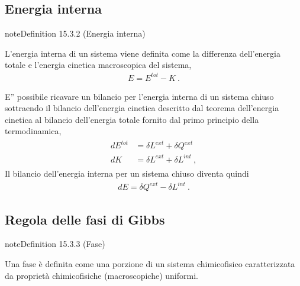 \documentclass[letterpaper,10pt,italian]{jupyterBook}
\begin{document}
\subsection{Energia interna}
\label{\detokenize{ch/thermodynamics/principles-gibbs-phase-rule:energia-interna}}\label{\detokenize{ch/thermodynamics/principles-gibbs-phase-rule:physics-hs-thermodynamics-foundation-principles-gibbs-phase-rule-internal-energy}}\label{ch/thermodynamics/principles-gibbs-phase-rule:definition-2}
\begin{sphinxadmonition}{note}{Definition 15.3.2 (Energia interna)}



\sphinxAtStartPar
L’energia interna di un sistema viene definita come la differenza dell’energia totale e l’energia cinetica macroscopica del sistema,
\begin{equation*}
\begin{split}E = E^{tot} - K \ .\end{split}
\end{equation*}\end{sphinxadmonition}

\sphinxAtStartPar
E” possibile ricavare un bilancio per l’energia interna di un sistema chiuso sottraendo il bilancio dell’energia cinetica descritto dal teorema dell’energia cinetica al bilancio dell’energia totale fornito dal primo principio della termodinamica,
\begin{equation*}
\begin{split}\begin{aligned}
  d E^{tot} & = \delta L^{ext} + \delta Q^{ext} \\
  d K       & = \delta L^{ext} + \delta L^{int} \ ,
\end{aligned}\end{split}
\end{equation*}
\sphinxAtStartPar
Il bilancio dell’energia interna per un sistema chiuso diventa quindi
\begin{equation*}
\begin{split}d E = \delta Q^{ext} - \delta L^{int} \ .\end{split}
\end{equation*}

\subsection{Regola delle fasi di Gibbs}
\label{\detokenize{ch/thermodynamics/principles-gibbs-phase-rule:regola-delle-fasi-di-gibbs}}\label{\detokenize{ch/thermodynamics/principles-gibbs-phase-rule:physics-hs-thermodynamics-foundation-principles-gibbs-phase-rule-gibbs-phase-rule}}\label{ch/thermodynamics/principles-gibbs-phase-rule:definition-3}
\begin{sphinxadmonition}{note}{Definition 15.3.3 (Fase)}



\sphinxAtStartPar
Una fase è definita come una porzione di un sistema chimico\sphinxhyphen{}fisico caratterizzata da proprietà chimico\sphinxhyphen{}fisiche (macroscopiche) uniformi.
\end{sphinxadmonition}
\end{document}
